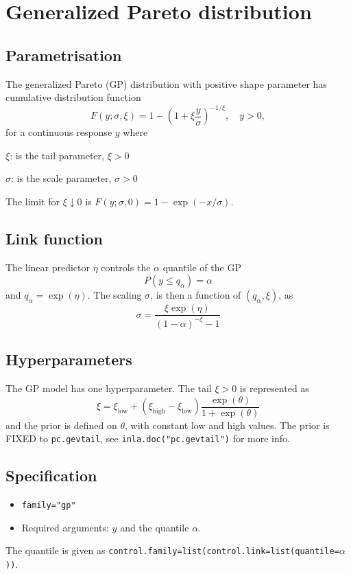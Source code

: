 \documentclass[12pt]{article}
\begin{document}
\section*{Generalized Pareto distribution}
\subsection*{Parametrisation}
The generalized Pareto (GP) distribution with positive shape parameter
has cumulative distribution function
$$
F(y;\sigma,\xi)=1-\left(1+\xi\frac{y}{\sigma}\right)^{-1/\xi},
\quad y>0,
$$
for a continuous response $y$ where
\begin{description}
\item $\xi$: is the tail parameter, $\xi>0$
\item $\sigma$: is the scale parameter, $\sigma>0$
\end{description}
The limit for $\xi\downarrow 0$ is
$F(y;\sigma,0)=1-\exp(-x/\sigma)$.

\subsection*{Link function}

The linear predictor $\eta$ controls the $\alpha$ quantile of
the GP
\begin{displaymath}
    P(y \le q_{\alpha}) = \alpha
\end{displaymath}
and $q_{\alpha} = \exp(\eta)$. The scaling $\sigma$, is then a
function of $(q_{\alpha}, \xi)$, as
\begin{displaymath}
    \sigma = \frac{\xi\exp(\eta)}{(1-\alpha)^{-\xi}-1}
\end{displaymath}

\subsection*{Hyperparameters}
The $\mathrm{GP}$ model has one hyperparameter. The tail $\xi>0$ is
represented as
$$
\xi = \xi_{\text{low}} + (\xi_{\text{high}} - \xi_{\text{low}})
\frac{\exp(\theta)}{1 + \exp(\theta)}
$$
and the prior is defined on $\theta$, with constant low and high
values. The prior is FIXED to \texttt{pc.gevtail}, see
\texttt{inla.doc("pc.gevtail")} for more info.

\subsection*{Specification}
\begin{itemize}
\item \texttt{family="gp"}
\item Required arguments: $y$ and the quantile $\alpha$. 
\end{itemize}
The quantile is given as \texttt{control.family=list(control.link=list(quantile=$\alpha$))}.
\end{document}
